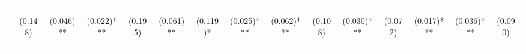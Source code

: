 \begin{center}
\begin{tabular}{lcccccccccccccc}
 & \begin{normalsize}(0.148)\end{normalsize} & \begin{normalsize}(0.046)**\end{normalsize} & \begin{normalsize}(0.022)***\end{normalsize} & \begin{normalsize}(0.195)\end{normalsize} & \begin{normalsize}(0.061)**\end{normalsize} & \begin{normalsize}(0.119)*\end{normalsize} & \begin{normalsize}(0.025)***\end{normalsize} & \begin{normalsize}(0.062)***\end{normalsize} & \begin{normalsize}(0.108)\end{normalsize} & \begin{normalsize}(0.030)***\end{normalsize} & \begin{normalsize}(0.072)\end{normalsize} & \begin{normalsize}(0.017)***\end{normalsize} & \begin{normalsize}(0.036)***\end{normalsize} & \begin{normalsize}(0.090)\end{normalsize}\\

\end{tabular}
\end{center}
